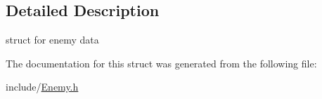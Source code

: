 \subsection{Detailed Description}
struct for enemy data 

The documentation for this struct was generated from the following file\-:\begin{DoxyCompactItemize}
\item 
include/\hyperlink{_enemy_8h}{Enemy.\-h}\end{DoxyCompactItemize}
